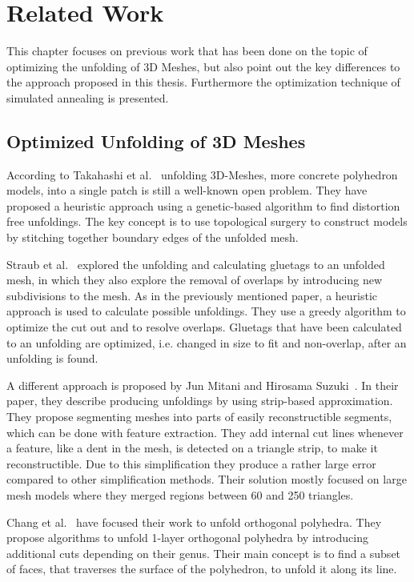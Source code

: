 \documentclass[draft,final]{vutinfth} %
\begin{document}
\chapter{Related Work}
\label{chap:relatedwork}
This chapter focuses on previous work that has been done on the topic of optimizing the unfolding of 3D Meshes, but also point out the key differences to the approach proposed in this thesis. Furthermore the optimization technique of simulated annealing is presented.

\section{Optimized Unfolding of 3D Meshes}
According to Takahashi et al.~\cite{takahashi2011optimized} unfolding 3D-Meshes, more concrete polyhedron models, into a single patch is still a well-known open problem. They have proposed a heuristic approach using a genetic-based algorithm to find distortion free unfoldings. The key concept is to use topological surgery to construct models by stitching together boundary edges of the unfolded mesh.

Straub et al.~\cite{straubcreating} explored the unfolding and calculating gluetags to an unfolded mesh, in which they also explore the removal of overlaps by introducing new subdivisions to the mesh. As in the previously mentioned paper, a heuristic approach is used to calculate possible unfoldings. They use a greedy algorithm to optimize the cut out and to resolve overlaps. Gluetags that have been calculated to an unfolding are optimized, i.e. changed in size to fit and non-overlap, after an unfolding is found.

A different approach is proposed by Jun Mitani and Hirosama Suzuki~\cite{mitani2004making}. In their paper, they describe producing unfoldings by using strip-based approximation. They propose segmenting meshes into parts of easily reconstructible segments, which can be done with feature extraction. They add internal cut lines whenever a feature, like a dent in the mesh, is detected on a triangle strip, to make it reconstructible. Due to this simplification they produce a rather large error compared to other simplification methods. Their solution mostly focused on large mesh models where they merged regions between 60 and 250 triangles.

Chang et al.~\cite{xi2016learning} have focused their work to unfold orthogonal polyhedra. They propose algorithms to unfold 1-layer orthogonal polyhedra by introducing additional cuts depending on their genus. Their main concept is to find a subset of faces, that traverses the surface of the polyhedron, to unfold it along its line. 
\end{document}
